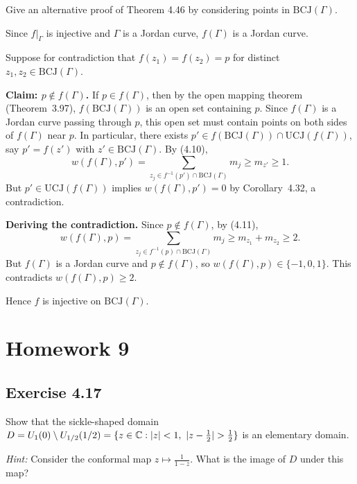 \documentclass{article}
\begin{document}
Give an alternative proof of Theorem 4.46 by considering points in
$\mathrm{BCJ}(\Gamma)$.

\begin{solution}
  Since $f|_\Gamma$ is injective and $\Gamma$ is a Jordan curve,
  $f(\Gamma)$ is a Jordan curve.

  Suppose for contradiction that
  $f(z_1) = f(z_2) = p$ for distinct $z_1, z_2 \in \mathrm{BCJ}(\Gamma)$.

  \textbf{Claim: $p \notin f(\Gamma)$.}\;
  If $p \in f(\Gamma)$, then by the open mapping theorem
  (Theorem~3.97), $f(\mathrm{BCJ}(\Gamma))$ is an open set
  containing $p$.
  Since $f(\Gamma)$ is a Jordan curve passing through $p$,
  this open set must contain points on both sides of $f(\Gamma)$
  near $p$.
  In particular, there exists
  $p' \in f(\mathrm{BCJ}(\Gamma)) \cap \mathrm{UCJ}(f(\Gamma))$,
  say $p' = f(z')$ with $z' \in \mathrm{BCJ}(\Gamma)$.
  By (4.10),
  \[
    w(f(\Gamma), p')
    = \sum_{z_j \in f^{-1}(p') \cap \mathrm{BCJ}(\Gamma)} m_j
    \ge m_{z'} \ge 1.
  \]
  But $p' \in \mathrm{UCJ}(f(\Gamma))$ implies
  $w(f(\Gamma), p') = 0$ by Corollary~4.32, a contradiction.

  \textbf{Deriving the contradiction.}\;
  Since $p \notin f(\Gamma)$, by (4.11),
  \[
    w(f(\Gamma), p)
    = \sum_{z_j \in f^{-1}(p) \cap \mathrm{BCJ}(\Gamma)} m_j
    \ge m_{z_1} + m_{z_2} \ge 2.
  \]
  But $f(\Gamma)$ is a Jordan curve and $p \notin f(\Gamma)$,
  so $w(f(\Gamma), p) \in \{-1, 0, 1\}$.
  This contradicts $w(f(\Gamma), p) \ge 2$.

  Hence $f$ is injective on $\mathrm{BCJ}(\Gamma)$.\qedhere
\end{solution}

\section{Homework 9}

\subsection{Exercise 4.17}

Show that the sickle-shaped domain
$D = U_1(0) \setminus U_{1/2}(1/2)
= \{z \in \mathbb{C} : |z| < 1,\ |z - \tfrac{1}{2}| > \tfrac{1}{2}\}$
is an elementary domain.

\textit{Hint:} Consider the conformal map $z \mapsto \frac{1}{1-z}$.
What is the image of $D$ under this map?
\end{document}
